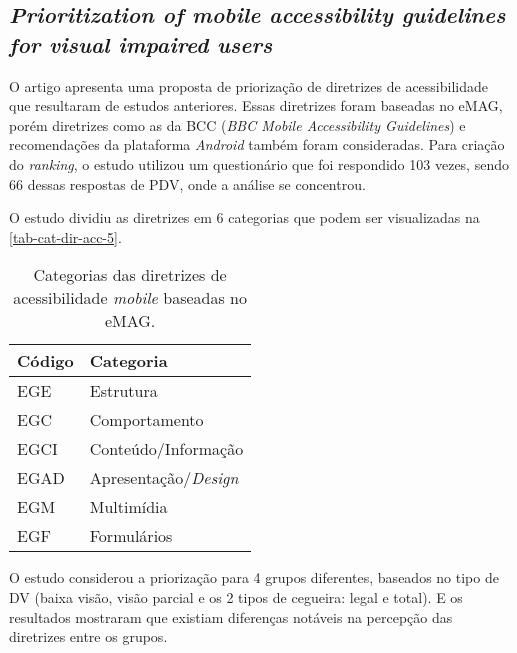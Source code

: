 \subsection{\emph{Prioritization of mobile accessibility guidelines for visual impaired users}}

O artigo apresenta uma proposta de priorização de diretrizes de acessibilidade que resultaram de estudos anteriores.
Essas diretrizes foram baseadas no eMAG, porém diretrizes como as da BCC (\emph{BBC Mobile Accessibility Guidelines}) e recomendações da plataforma \emph{Android} também foram consideradas.
Para criação do \emph{ranking}, o estudo utilizou um questionário que foi respondido 103 vezes, sendo 66 dessas respostas de PDV, onde a análise se concentrou.

O estudo dividiu as diretrizes em 6 categorias que podem ser visualizadas na \autoref{tab-cat-dir-acc-5}.

\begin{table}[htb]
  \begin{center}
    \ABNTEXfontereduzida
    \caption{Categorias das diretrizes de acessibilidade \emph{mobile} baseadas no eMAG.}
    \label{tab-cat-dir-acc-5}
    \begin{tabular}{p{1.5cm}|p{4.5cm}}
      \textbf{Código} & \textbf{Categoria}         \\
      \hline
      EGE             & Estrutura                  \\
      \hline
      EGC             & Comportamento              \\
      \hline
      EGCI            & Conteúdo/Informação        \\
      \hline
      EGAD            & Apresentação/\emph{Design} \\
      \hline
      EGM             & Multimídia                 \\
      \hline
      EGF             & Formulários                \\
    \end{tabular}
  \end{center}
\end{table}

O estudo considerou a priorização para 4 grupos diferentes, baseados no tipo de DV (baixa visão, visão parcial e os 2 tipos de cegueira: legal e total).
E os resultados mostraram que existiam diferenças notáveis na percepção das diretrizes entre os grupos.

